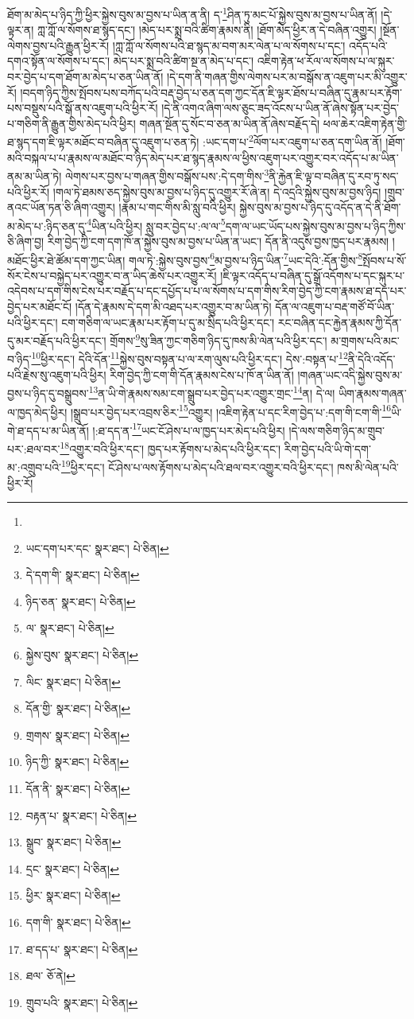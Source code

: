 ཐོག་མ་མེད་པ་ཉིད་ཀྱི་ཕྱིར་སྐྱེས་བུས་མ་བྱས་པ་ཡིན་ན་ནི། ད་\footnote{}ཤིན་ཏུ་མང་པོ་སྐྱེས་བུས་མ་བྱས་པ་ཡིན་ནོ། །དེ་ལྟར་ན། ཀླ་ཀློ་ལ་སོགས་ཐ་སྙད་དང་། །མེད་པར་སྨྲ་བའི་ཚིག་རྣམས་ནི། །ཐོག་མེད་ཕྱིར་ན་དེ་བཞིན་འགྱུར། །སྔོན་ལེགས་བྱས་པའི་རྒྱུན་ཕྱིར་རོ། །ཀླ་ཀློ་ལ་སོགས་པའི་ཐ་སྙད་མ་བག་མར་ལེན་པ་ལ་སོགས་པ་དང་། འདོད་པའི་དགའ་སྟོན་ལ་སོགས་པ་དང་། མེད་པར་སྨྲ་བའི་ཚིག་སྔ་ན་མེད་པ་དང་། འཇིག་རྟེན་ཕ་རོལ་ལ་སོགས་པ་ལ་སྐུར་བར་བྱེད་པ་དག་ཐོག་མ་མེད་པ་ཅན་ཡིན་ནོ། །དེ་དག་ནི་གཞན་གྱིས་ལེགས་པར་མ་བསྒོས་ན་འཇུག་པར་མི་འགྱུར་རོ། །བདག་ཉིད་ཀྱིས་སྤོབས་པས་བཀོད་པའི་བརྡ་བྱེད་པ་ཅན་དག་ཀྱང་དོན་ཇི་ལྟར་ཐོས་པ་བཞིན་དུ་རྣམ་པར་རྟོག་པས་བསྡུས་པའི་སྒོ་ནས་འཇུག་པའི་ཕྱིར་རོ། །དེ་ནི་འགའ་ཞིག་ལས་ཅུང་ཟད་འོངས་པ་ཡིན་ནོ་ཞེས་སྟོན་པར་བྱེད་པ་གཅིག་ནི་རྒྱུན་གྱིས་མེད་པའི་ཕྱིར། གཞན་སྔོན་དུ་སོང་བ་ཅན་མ་ཡིན་ནོ་ཞེས་བརྗོད་དེ། ཕལ་ཆེར་འཇིག་རྟེན་གྱི་ཐ་སྙད་དག་ཇི་ལྟར་མཐོང་བ་བཞིན་དུ་འཇུག་པ་ཅན་ཏེ། :ཡང་དག་པ་\footnote{ཡང་དག་པར་དང་  སྣར་ཐང་།  པེ་ཅིན། }ལོག་པར་འཇུག་པ་ཅན་དག་ཡིན་ནོ། །ཐོག་མའི་བསྐལ་པ་པ་རྣམས་ལ་མཐོང་བ་ཉིད་མེད་པར་ཐ་སྙད་རྣམས་ལ་ཕྱིས་འཇུག་པར་འགྱུར་བར་འདོད་པ་མ་ཡིན་ནམ་མ་ཡིན་ཏེ། ལེགས་པར་བྱས་པ་གཞན་གྱིས་བསྒོས་པས་:དེ་དག་གིས་\footnote{དེ་དག་གི་  སྣར་ཐང་།  པེ་ཅིན། }ནི་རྐྱེན་ཇི་ལྟ་བ་བཞིན་དུ་རབ་ཏུ་སད་པའི་ཕྱིར་རོ། །གལ་ཏེ་ཐམས་ཅད་སྐྱེས་བུས་མ་བྱས་པ་ཉིད་དུ་འགྱུར་རོ་ཞེ་ན། དེ་འདྲའི་སྐྱེས་བུས་མ་བྱས་ཉིད། །གྲུབ་ནའང་ཡོན་ཏན་ཅི་ཞིག་འགྱུར། །རྣམ་པ་གང་གིས་མི་སླུ་བའི་ཕྱིར། སྐྱེས་བུས་མ་བྱས་པ་ཉིད་དུ་འདོད་ན་དེ་ནི་ཐོག་མ་མེད་པ་:ཉིད་ཅན་དུ་\footnote{ཉིད་ཅན་  སྣར་ཐང་།  པེ་ཅིན། }ཡིན་པའི་ཕྱིར། སླུ་བར་བྱེད་པ་:ལ་ལ་\footnote{ལ་  སྣར་ཐང་།  པེ་ཅིན། }དག་ལ་ཡང་ཡོད་པས་སྐྱེས་བུས་མ་བྱས་པ་ཉིད་ཀྱིས་ཅི་ཞིག་བྱ། རིག་བྱེད་ཀྱི་ངག་དག་ཁོ་ན་སྐྱེས་བུས་མ་བྱས་པ་ཡིན་ན་ཡང་། དོན་ནི་འདུས་བྱས་ཁྱད་པར་རྣམས། །མཐོང་ཕྱིར་ཐེ་ཚོམ་དག་ཀྱང་ཡིན། གལ་ཏེ་:སྐྱེས་བུས་བྱས་\footnote{སྐྱེས་བུས་  སྣར་ཐང་།  པེ་ཅིན། }མ་བྱས་པ་ཉིད་ཡིན་\footnote{ལིང་  སྣར་ཐང་།  པེ་ཅིན། }ཡང་དེའི་:དོན་གྱིས་\footnote{དོན་གྱི་  སྣར་ཐང་།  པེ་ཅིན། }སྤོབས་པ་སོ་སོར་ངེས་པ་བསྐྱེད་པར་འགྱུར་བ་ན་ཡིད་ཆེས་པར་འགྱུར་རོ། །ཇི་ལྟར་འདོད་པ་བཞིན་དུ་སྒྲོ་འདོགས་པ་དང་སྐུར་པ་འདེབས་པ་དག་གིས་ངེས་པར་བརྗོད་པ་དང་དཔྱོད་པ་པ་ལ་སོགས་པ་དག་གིས་རིག་བྱེད་ཀྱི་ངག་རྣམས་ཐ་དད་པར་བྱེད་པར་མཐོང་ངོ། །དོན་དེ་རྣམས་དེ་དག་མི་འཐད་པར་འགྱུར་བ་མ་ཡིན་ཏེ། དོན་ལ་འཇུག་པ་བརྡ་གཙོ་བོ་ཡིན་པའི་ཕྱིར་དང་། ངག་གཅིག་ལ་ཡང་རྣམ་པར་རྟོག་པ་དུ་མ་སྲིད་པའི་ཕྱིར་དང་། རང་བཞིན་དང་རྐྱེན་རྣམས་ཀྱི་དོན་དུ་མར་བརྗོད་པའི་ཕྱིར་དང་། གྲོགས་\footnote{གྲགས་  སྣར་ཐང་།  པེ་ཅིན། }སུ་ཟིན་ཀྱང་གཅིག་ཉིད་དུ་ཁས་མི་ལེན་པའི་ཕྱིར་དང་། མ་གྲགས་པའི་མང་བ་ཉིད་\footnote{ཉིད་ཀྱི་  སྣར་ཐང་།  པེ་ཅིན། }ཕྱིར་དང་། དེའི་དོན་\footnote{དོན་ནི་  སྣར་ཐང་།  པེ་ཅིན། }སྐྱེས་བུས་བསྟན་པ་ལ་རག་ལུས་པའི་ཕྱིར་དང་། དེས་:བསྟན་པ་\footnote{བརྟན་པ་  སྣར་ཐང་།  པེ་ཅིན། }ནི་དེའི་འདོད་པའི་རྗེས་སུ་འཇུག་པའི་ཕྱིར། རིག་བྱེད་ཀྱི་ངག་གི་དོན་རྣམས་ངེས་པ་ཁོ་ན་ཡིན་ནོ། །གཞན་ཡང་འདི་སྐྱེས་བུས་མ་བྱས་པ་ཉིད་དུ་བསྒྲུབས་\footnote{སྒྲུབ་  སྣར་ཐང་།  པེ་ཅིན། }ན་ཡི་གེ་རྣམས་སམ་ངག་སྒྲུབ་པར་བྱེད་པར་འགྱུར་གྲང་\footnote{དྲང་  སྣར་ཐང་།  པེ་ཅིན། }ན། དེ་ལ། ཡིག་རྣམས་གཞན་ལ་ཁྱད་མེད་ཕྱིར། །སྒྲུབ་པར་བྱེད་པར་འབྲས་ཅིར་\footnote{ཕྱིར་  སྣར་ཐང་།  པེ་ཅིན། }འགྱུར། །འཇིག་རྟེན་པ་དང་རིག་བྱེད་པ་:དག་གི་ངག་གི་\footnote{དག་གི་  སྣར་ཐང་།  པེ་ཅིན། }ཡི་གེ་ཐ་དད་པ་མ་ཡིན་ནོ། །:ཐ་དད་ན་\footnote{ཐ་དད་པ་  སྣར་ཐང་།  པེ་ཅིན། }ཡང་ངོ་ཤེས་པ་ལ་ཁྱད་པར་མེད་པའི་ཕྱིར། །དེ་ལས་གཅིག་ཉིད་མ་གྲུབ་པར་:ཐལ་བར་\footnote{ཐལ་  ཅོ་ནེ། }འགྱུར་བའི་ཕྱིར་དང་། ཁྱད་པར་རྟོགས་པ་མེད་པའི་ཕྱིར་དང་། རིག་བྱེད་པའི་ཡི་གེ་དག་མ་:འགྲུབ་པའི་\footnote{གྲུབ་པའི་  སྣར་ཐང་།  པེ་ཅིན། }ཕྱིར་དང་། ངོ་ཤེས་པ་ལས་རྟོགས་པ་མེད་པའི་ཐལ་བར་འགྱུར་བའི་ཕྱིར་དང་། ཁས་མི་ལེན་པའི་ཕྱིར་རོ། 